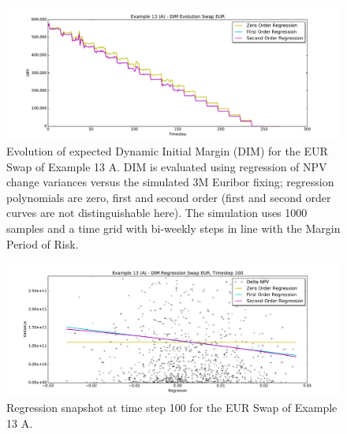 \documentclass[12pt, a4paper]{article}
\begin{document}
\begin{figure}[h!]
\begin{center}
\includegraphics[scale=0.45]{mpl_dim_evolution_A_swap_eur.pdf}
\end{center}
\caption{Evolution of expected Dynamic Initial Margin (DIM) for the EUR Swap of Example 13 A. DIM is evaluated using
  regression of NPV change variances versus the simulated 3M Euribor fixing; regression polynomials are zero, first and
  second order (first and second order curves are not distinguishable here). The simulation uses 1000 samples and a time
  grid with bi-weekly steps in line with the Margin Period of Risk.}
\label{fig_ex13a_evolution}
\end{figure}

\begin{figure}[h!]
\begin{center}
\includegraphics[scale=0.45]{mpl_dim_regression_A_swap_eur.pdf}
\end{center}
\caption{Regression snapshot at time step 100 for the EUR Swap of Example 13 A.}
\label{fig_ex13a_regression}
\end{figure}
\end{document}

